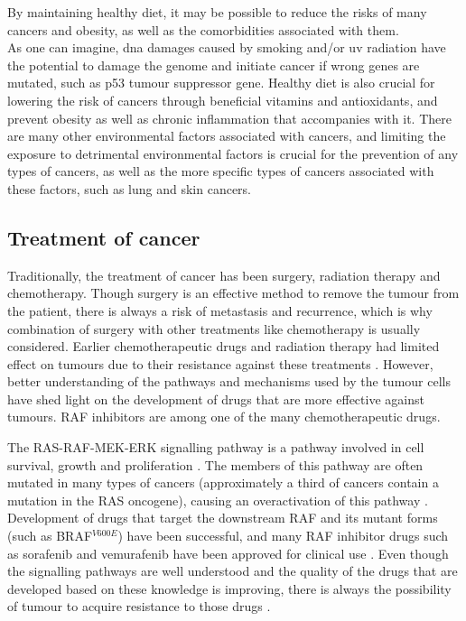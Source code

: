 By maintaining healthy diet, it may be possible to reduce the risks of many cancers and obesity, as well as the comorbidities associated with them.
\\

\noindent
As one can imagine, \acrshort{dna} damages caused by smoking and/or \gls{uv} radiation have the potential to damage the genome and initiate cancer if wrong genes are mutated, such as p53 tumour suppressor gene.
Healthy diet is also crucial for lowering the risk of cancers through beneficial vitamins and antioxidants, and prevent obesity as well as chronic inflammation that accompanies with it.
There are many other environmental factors associated with cancers, and limiting the exposure to detrimental environmental factors is crucial for the prevention of any types of cancers, as well as the more specific types of cancers associated with these factors, such as lung and skin cancers.
\\

\subsection{Treatment of cancer}
\label{sub:treatment_of_cancer}

Traditionally, the treatment of cancer has been surgery, radiation therapy and chemotherapy.
Though surgery is an effective method to remove the tumour from the patient, there is always a risk of metastasis and recurrence, which is why combination of surgery with other treatments like chemotherapy is usually considered.
Earlier chemotherapeutic drugs and radiation therapy had limited effect on tumours due to their resistance against these treatments \citep{Wilhelm2006}.
However, better understanding of the pathways and mechanisms used by the tumour cells have shed  light on the development of drugs that are more effective against tumours.
RAF inhibitors are among one of the many chemotherapeutic drugs.

The RAS-RAF-MEK-ERK signalling pathway is a pathway involved in cell survival, growth and proliferation \citep{Samatar2014,Wilhelm2006}.
The members of this pathway are often mutated in many types of cancers (approximately a third of cancers contain a mutation in the RAS oncogene), causing an overactivation of this pathway \citep{Samatar2014}.
Development of drugs that target  the downstream RAF and its mutant forms (such as BRAF$^{V600E}$) have been successful, and many RAF inhibitor drugs such as sorafenib and vemurafenib have been approved for clinical use \citep{Samatar2014,Wilhelm2006}.
Even though the signalling pathways are well understood and the quality of the drugs that are developed based on these knowledge is improving, there is always the possibility of tumour to acquire resistance to those drugs \citep{Samatar2014}.

